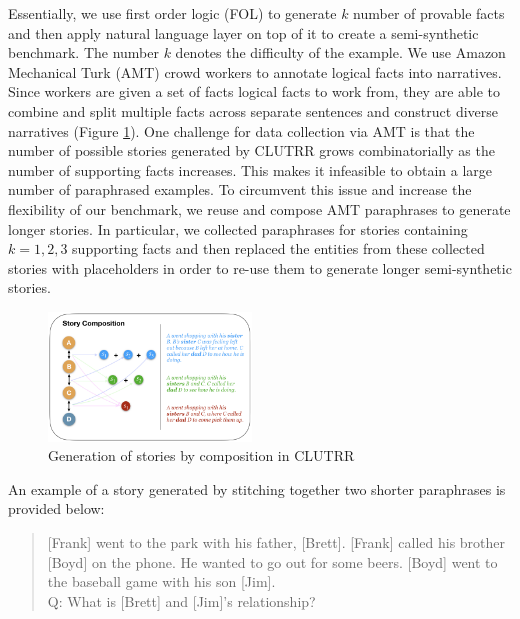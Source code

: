 \documentclass[12pt]{article}
\begin{document}
Essentially, we use first order logic (FOL) to generate $k$ number of provable facts and then apply natural language layer on top of it to create a semi-synthetic benchmark. The number $k$ denotes the difficulty of the example. We use Amazon Mechanical Turk (AMT) crowd workers to annotate logical facts into narratives. Since workers are given a set of facts logical facts to work from, they are able to combine and split multiple facts across separate sentences and construct diverse narratives (Figure \ref{fig:clutrr_composition}).
One challenge for data collection via AMT is that the number of possible stories generated by CLUTRR grows combinatorially as the number of supporting facts increases. This makes it infeasible to obtain a large number of paraphrased examples. To circumvent this issue and increase the flexibility of our benchmark, we reuse and compose AMT paraphrases to generate longer stories.
In particular, we collected paraphrases for stories containing $k=1,2,3$ supporting facts and then replaced the entities from these collected stories with placeholders in order to re-use them to generate longer semi-synthetic stories.

\begin{figure}
\begin{center}
  \includegraphics[width=0.48\textwidth]{images/clutrr_composition.png}
\end{center}
\caption{Generation of stories by composition in CLUTRR}
\label{fig:clutrr_composition}
\end{figure}



An example of a story generated by stitching together two shorter paraphrases is provided below:

\begin{quote}{\small
    [Frank] went to the park with his father, [Brett]. [Frank] called his brother [Boyd] on the phone. He wanted to go out for some beers.
    [Boyd] went to the baseball game with his son [Jim].\\
    Q: What is [Brett] and [Jim]'s relationship?}
\end{quote}
\end{document}
